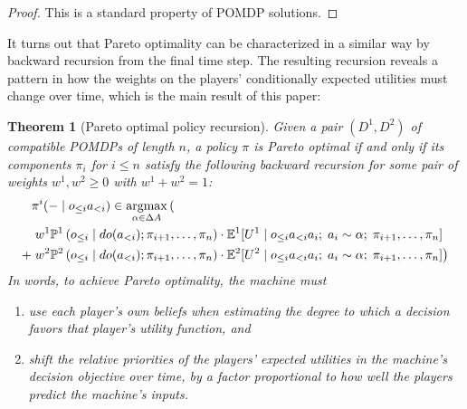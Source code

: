 \documentclass{article}  %
\newcommand{\hist}[1]{o_{\le #1}a_{<#1}}
\newcommand{\dohist}[1]{o_{\le #1} \mid do(a_{<#1})}
\DeclareMathOperator*{\argmax}{argmax}
\newtheorem{theorem}{Theorem}
\begin{document}
\begin{proof}
This is a standard property of POMDP solutions.
\end{proof}

It turns out that Pareto optimality can be characterized in a similar way by backward recursion from the final time step.  The resulting recursion reveals a pattern in how the weights on the players' conditionally expected utilities must change over time, which is the main result of this paper:

\begin{theorem}[Pareto optimal policy recursion]\label{thm:main}
Given a pair $(D^1,D^2)$ of compatible POMDPs of length $n$, a policy $\pi$ is Pareto optimal if and only if its components $\pi_i$ for $i\le n$ satisfy the following backward recursion for some pair of weights $w^1,w^2\geq 0$ with $w^1+w^2=1$:
\begin{align*}
&\pi^i(-\mid\hist{i}) \in \argmax_{\alpha\in\Delta A} \left(\vphantom{\left(\left(\right)\right)}\right.\\
& \left.w^1 \PP^1\left(\dohist{i}; \pi_{i+1},\ldots,\pi_n\right)\cdot \EE^1[U^1 \mid \hist{i} a_i ;\; a_i\sim \alpha;\; \pi_{i+1},\ldots,\pi_n]\right.\\
+ & \left.w^2 \PP^2\left(\dohist{i}; \pi_{i+1},\ldots,\pi_n\right)\cdot \EE^2[U^2 \mid \hist{i} a_i;\; a_i\sim \alpha;\; \pi_{i+1},\ldots,\pi_n] \right)
\end{align*}
In words, to achieve Pareto optimality, the machine must
\begin{enumerate}
\item use each player's own beliefs when estimating the degree to which a decision favors that player's utility function, and
\item shift the relative priorities of the players' expected utilities in the machine's decision objective over time, by a factor proportional to how well the players predict the machine's inputs.
\end{enumerate}
\end{theorem}
\end{document}
